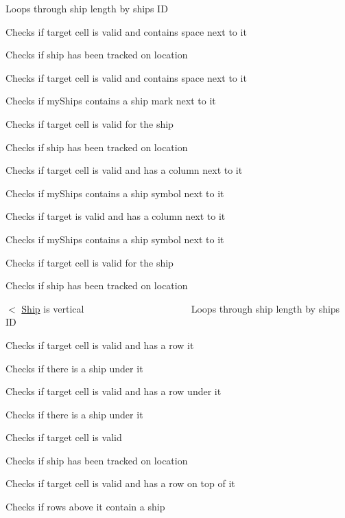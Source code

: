 Loops through ship length by ship\textquotesingle{}s ID

Checks if target cell is valid and contains space next to it

Checks if ship has been tracked on location

Checks if target cell is valid and contains space next to it

Checks if my\+Ships contains a ship mark next to it

Checks if target cell is valid for the ship

Checks if ship has been tracked on location

Checks if target cell is valid and has a column next to it

Checks if my\+Ships contains a ship symbol next to it

Checks if target is valid and has a column next to it

Checks if my\+Ships contains a ship symbol next to it

Checks if target cell is valid for the ship

Checks if ship has been tracked on location

$<$ \mbox{\hyperlink{class_ship}{Ship}} is vertical ~\newline
~\newline
~\newline
~\newline
~\newline
~\newline
~\newline
~\newline
~\newline
~\newline
~\newline
~\newline
~\newline
 Loops through ship length by ship\textquotesingle{}s ID

Checks if target cell is valid and has a row it

Checks if there is a ship under it

Checks if target cell is valid and has a row under it

Checks if there is a ship under it

Checks if target cell is valid

Checks if ship has been tracked on location

Checks if target cell is valid and has a row on top of it

Checks if rows above it contain a ship

